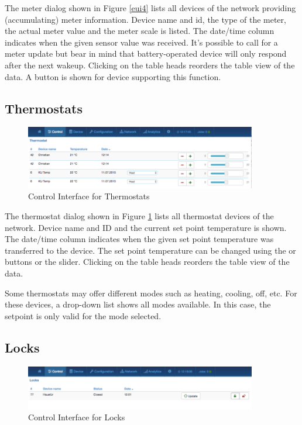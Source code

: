 The meter dialog shown in Figure \ref{eui4} lists all devices of the network providing  
(accumulating) meter information.
Device name and id, the type of the meter, the actual meter value and the meter scale
 is listed. The date/time column indicates when the given sensor value was received. It’s 
 possible to call for a meter update but bear in mind that battery-operated device will 
 only respond after the next wakeup. Clicking on the table heads reorders the table 
 view of the data. A  button is shown for device supporting this function.

\subsection{Thermostats}

\begin{figure}
\begin{center}
\includegraphics[width=0.9\textwidth]{pngs/cap7/eui5.png}
\caption{Control Interface for Thermostats}
\label{eui5}
\end{center}
\end{figure}

The thermostat dialog shown in Figure \ref{eui5} lists all thermostat devices of the 
network. Device name and ID and the current set point temperature is shown. The date/time 
column indicates when the given set point temperature was transferred to the device. The 
set point temperature can be changed using the \keystroke{+} or \keystroke{-} buttons or the slider. Clicking 
on the table heads reorders the table view of the data.

Some thermostats may offer different modes such as heating, cooling, off, etc. For these 
devices, a drop-down list shows all modes available. In this case, the setpoint is only 
valid for the mode selected.

\subsection{Locks}

\begin{figure}
\begin{center}
\includegraphics[width=0.9\textwidth]{pngs/cap7/eui6.png}
\caption{Control Interface for Locks}
\label{eui6}
\end{center}
\end{figure}

